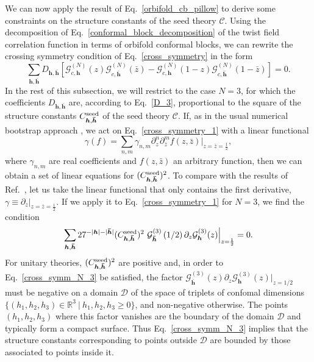 \documentclass[a4paper,11pt]{article}
\begin{document}
We can now apply the result of Eq.~\eqref{orbifold_cb_pillow} to derive 
some constraints on the structure constants of the seed theory $\mathcal{C}$.
Using the decomposition of Eq.~\eqref{conformal_block_decomposition} of the twist field correlation function 
in terms of orbifold conformal blocks, we can rewrite the crossing symmetry condition 
of Eq.~\eqref{cross_symmetry} in the form
\begin{equation}\label{cross_symmetry_1}
 \sum_{\boldsymbol{h}, \boldsymbol{\bar{h}}} D_{\boldsymbol{h}, \boldsymbol{\bar{h}}}\left[
 \mathcal{G}_{c, \boldsymbol{h}}^{(N)}(z)\mathcal{G}_{c, \boldsymbol{\bar{h}}}^{(N)}(\bar{z})-
 \mathcal{G}_{c, \boldsymbol{h}}^{(N)}(1-z)\mathcal{G}_{c, \boldsymbol{\bar{h}}}^{(N)}(1-\bar{z})\right]=0.
\end{equation}
In the rest of this subsection, we will restrict to the case $N=3$, 
for which the coefficients $D_{\boldsymbol{h}, \boldsymbol{\bar{h}}}$ are, according 
to Eq.~\eqref{D_3}, proportional to the square of the structure constants 
$C_{\boldsymbol{h}, \boldsymbol{\bar{h}}}^{{\rm seed}}$ of the seed 
theory $\mathcal{C}$. If, as in the usual numerical bootstrap approach 
\cite{Rattazzi, Poland}, we act on Eq.~\eqref{cross_symmetry_1} with a linear functional
\begin{equation}
 \gamma(f)=\sum_{n, m} \gamma_{n, m}\partial_{z}^n\partial_{\bar{z}}^m f(z,\bar{z})\Bigr|_{z=\bar{z}=\frac{1}{2}},
\end{equation}
where $\gamma_{n, m}$ are real coefficients and $f(z,\bar{z})$ an arbitrary function, then 
we can obtain a set of linear equations for $(C_{\boldsymbol{h}, \boldsymbol{\bar{h}}}^{{\rm seed}})^2$.
To compare with the results of Ref.~\cite{Collier}, let us take the linear functional that only 
contains the first derivative, $\gamma\equiv\partial_z|_{z=\bar{z}=\frac{1}{2}}$. If we apply it to 
Eq.~\eqref{cross_symmetry_1} for $N=3$, we find the condition
\begin{equation}\label{cross_symm_N_3}
 \sum_{\boldsymbol{h},\boldsymbol{\bar{h}}} 27^{-|\boldsymbol{h}|-|\boldsymbol{\bar{h}}|}
 (C_{\boldsymbol{h}, \boldsymbol{\bar{h}}}^{{\rm seed}})^2~\mathcal{G}_{\boldsymbol{\bar{h}}}^{(3)}\left(1/2\right)
 \partial_z\mathcal{G}_{\boldsymbol{h}}^{(3)}(z)\Bigr|_{z=\frac{1}{2}}=0.
\end{equation}
For unitary theories, $(C_{\boldsymbol{h}, \boldsymbol{\bar{h}}}^{{\rm seed}})^2$ are positive and, 
in order to Eq.~\eqref{cross_symm_N_3} be satisfied, the factor $\mathcal{G}_{\boldsymbol{\bar{h}}}^{(3)}(z)
\partial_z\mathcal{G}_{\boldsymbol{h}}^{(3)}(z)\bigr|_{z=1/2}$ must be negative on a domain $\mathscr{D}$
of the space of triplets of confomal dimensions $\{(h_1, h_2, h_3)\in \mathbb{R}^3~|~h_1, h_2, h_3\geq 0\}$,
and non-negative otherwise. The points $(h_1, h_2, h_3)$ where this factor vanishes are the boundary
of the domain $\mathscr{D}$ and typically form a compact surface. Thus Eq.~\eqref{cross_symm_N_3} implies that the structure constants 
corresponding to points outside $\mathscr{D}$ are bounded by those associated to points inside it. 
\end{document}
